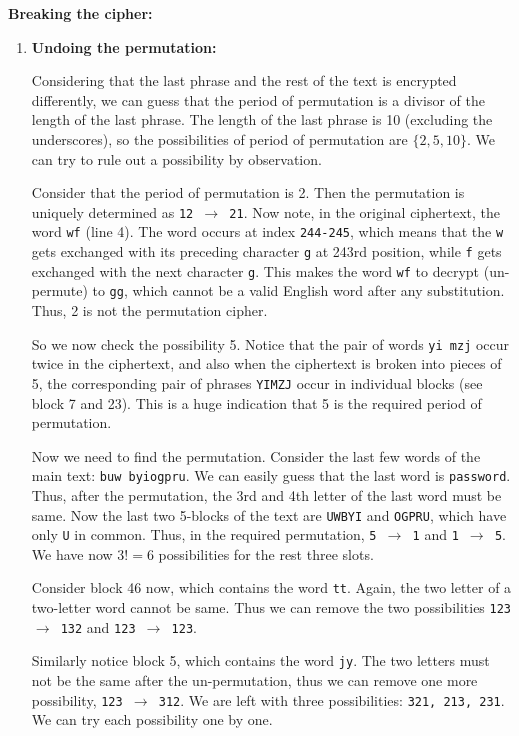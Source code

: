 \documentclass[11pt]{article}
\begin{document}
  \begin{minipage}{0.75\linewidth}
    \textbf{Breaking the cipher: }

    \begin{enumerate}
    \item \textbf{Undoing the permutation: }
    
    \bigskip
    
    Considering that the last phrase and the rest of the text is encrypted differently, we can guess that the period of permutation is a divisor of the length of the last phrase. The length of the last phrase is 10 (excluding the underscores), so the possibilities of period of permutation are $\{2, 5, 10\}$. We can try to rule out a possibility by observation.
    \medskip

    Consider that the period of permutation is 2. Then the permutation is uniquely determined as \texttt{12 $\rightarrow$ 21}. Now note, in the original ciphertext, the word \texttt{wf} (line 4). The word occurs at index \texttt{244-245}, which means that the \texttt{w} gets exchanged with its preceding character \texttt{g} at 243rd position, while \texttt{f} gets exchanged with the next character \texttt{g}. This makes the word \texttt{wf} to decrypt (un-permute) to \texttt{gg}, which cannot be a valid English word after any substitution. Thus, 2 is not the permutation cipher.
    \medskip

    So we now check the possibility 5. Notice that the pair of words \texttt{yi mzj} occur twice in the ciphertext, and also when the ciphertext is broken into pieces of 5, the corresponding pair of phrases \texttt{YIMZJ} occur in individual blocks (see block 7 and 23). This is a huge indication that 5 is the required period of permutation.
    \bigskip

    Now we need to find the permutation. Consider the last few words of the main text: \texttt{buw byiogpru}. We can easily guess that the last word is \texttt{password}. Thus, after the permutation, the 3rd and 4th letter of the last word must be same. Now the last two 5-blocks of the text are \texttt{UWBYI} and \texttt{OGPRU}, which have only \texttt{U} in common. Thus, in the required permutation, \texttt{5 $\rightarrow$ 1} and \texttt{1 $\rightarrow$ 5}. We have now $3! = 6$ possibilities for the rest three slots.

    Consider block 46 now, which contains the word \texttt{tt}. Again, the two letter of a two-letter word cannot be same. Thus we can remove the two possibilities \texttt{123 $\rightarrow$ 132} and \texttt{123 $\rightarrow$ 123}.

    Similarly notice block 5, which contains the word \texttt{jy}. The two letters must not be the same after the un-permutation, thus we can remove one more possibility, \texttt{123 $\rightarrow$ 312}. We are left with three possibilities: \texttt{321, 213, 231}. We can try each possibility one by one.
    
  \end{enumerate}
\end{minipage}
\end{document}
